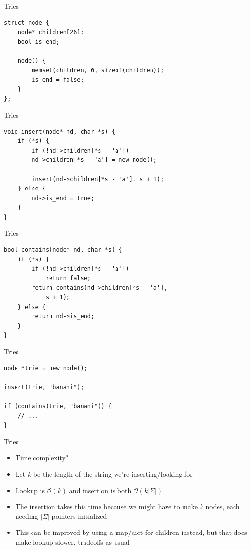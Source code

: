 \documentclass{beamer}
\begin{document}
	\begin{frame}{Tries}
		\begin{verbatim}
struct node {
	node* children[26];
	bool is_end;
	
	node() {
		memset(children, 0, sizeof(children));
		is_end = false;
	}
};
		\end{verbatim}
	\end{frame}
	
	\begin{frame}{Tries}
		\begin{verbatim}
void insert(node* nd, char *s) {
	if (*s) {
		if (!nd->children[*s - 'a'])
		nd->children[*s - 'a'] = new node();
		
		insert(nd->children[*s - 'a'], s + 1);
	} else {
		nd->is_end = true;
	}
}
		\end{verbatim}
	\end{frame}
	
	\begin{frame}{Tries}
		\begin{verbatim}
bool contains(node* nd, char *s) {
	if (*s) {
		if (!nd->children[*s - 'a'])
		    return false;
		return contains(nd->children[*s - 'a'], 
		    s + 1);
	} else {
		return nd->is_end;
	}
}
		\end{verbatim}
	\end{frame}
	
	\begin{frame}{Tries}
		\begin{verbatim}
node *trie = new node();

insert(trie, "banani");

if (contains(trie, "banani")) {
	// ...
}
		\end{verbatim}
	\end{frame}
	
	\begin{frame}[plain]{Tries}
		\begin{itemize}
			\item Time complexity?
			\vspace{10pt}
			\item Let $k$ be the length of the string we're inserting/looking for
			\item Lookup is $\mathcal{O}(k)$ and insertion is both $\mathcal{O}(k|\Sigma|)$
			\item The insertion takes this time because we might have to make $k$ nodes, each needing $|\Sigma|$ pointers initialized
			\item This can be improved by using a map/dict for children instead, but that does make lookup slower, tradeoffs as usual
		\end{itemize}
	\end{frame}
	
\end{document}
